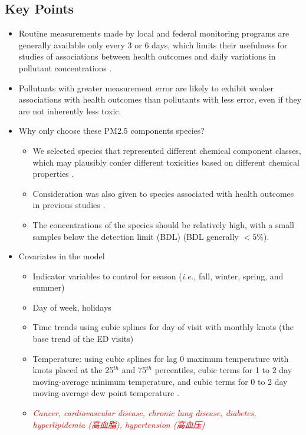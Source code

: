 \documentclass{article}
\begin{document}
\subsection{Key Points}
\begin{itemize}
    \item Routine measurements made by local and federal monitoring programs are generally available only every 3 or 6 days, which limits their usefulness for studies of associations between health outcomes and daily variations in pollutant concentrations \citep{sarnat2015fine}.
    \item Pollutants with greater measurement error are likely to exhibit weaker associations with health outcomes than pollutants with less error, even if they are not inherently less toxic.
    \item Why only choose these PM2.5 components species? {
        \begin{itemize}
            \item We selected species that represented different chemical component classes, which may plausibly confer different toxicities based on different chemical properties \citep{suh2011chemical}. 
            \item Consideration was also given to species associated with health outcomes in previous studies \citep{chen2009effects, kelly2012size, rohr2012attributing}.
            \item The concentrations of the species should be relatively high, with a small samples below the detection limit (BDL) (BDL generally $<5\%$).
        \end{itemize}
    }
    \item Covariates in the model {
        \begin{itemize}
            \item Indicator variables to control for season (\textit{i.e.,} fall, winter, spring, and summer)
            \item Day of week, holidays
            \item Time trends using cubic splines for day of visit with monthly knots (the base trend of the ED visits)
            \item Temperature: using cubic splines for lag 0 maximum temperature with knots placed at the 25$^{th}$ and 75$^{th}$ percentiles, cubic terms for 1 to 2 day moving-average minimum temperature, and cubic terms for 0 to 2 day moving-average dew point temperature \citep{strickland2010short}.
            \item \textit{\textcolor{red}{Cancer, cardiovascular disease, chronic lung disease, diabetes, hyperlipidemia (高血脂), hypertension (高血压)}}

\end{itemize}}
\end{itemize}
\end{document}
